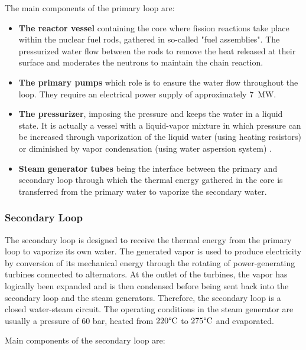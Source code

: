 \npar

The main components of the primary loop are:

\begin{itemize}
\item \textbf{The reactor vessel} containing the core where fission reactions take place within the nuclear fuel rods, gathered in so-called "fuel assemblies". The pressurized water flow between the rods to remove the heat released at their surface and moderates the neutrons to maintain the chain reaction.

\item \textbf{The primary pumps} which role is to ensure the water flow throughout the loop. They require an electrical power supply of approximately 7~MW.

\item \textbf{The pressurizer}, imposing the pressure and keeps the water in a liquid state. It is actually a vessel with a liquid-vapor mixture in which pressure can be increased through vaporization of the liquid water (using heating resistors) or diminished by vapor condensation (using water aspersion system) .

\item \textbf{Steam generator tubes} being the interface between the primary and secondary loop through which the thermal energy gathered in the core is transferred from the primary water to vaporize the secondary water.
\end{itemize}


\subsubsection{Secondary Loop}

The secondary loop is designed to receive the thermal energy from the primary loop to vaporize its own water. The generated vapor is used to produce electricity by conversion of its mechanical energy through the rotating of power-generating turbines connected to alternators. At the outlet of the turbines, the vapor has logically been expanded and is then condensed before being sent back into the secondary loop and the steam generators. Therefore, the secondary loop is a closed water-steam circuit. The operating conditions in the steam generator are usually a pressure of 60 bar, heated from $220\degree\mathrm{C}$ to $275\degree\mathrm{C}$ and evaporated.

\npar

Main components of the secondary loop are:

